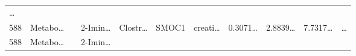 \documentclass[
]{article}
\begin{document}
\begin{longtable}[]{@{}lllllllllll@{}}
\begin{minipage}[t]{0.03\columnwidth}
\ldots{}\strut
\end{minipage}\tabularnewline
\begin{minipage}[t]{0.03\columnwidth}\raggedright
588\strut
\end{minipage} & \begin{minipage}[t]{0.07\columnwidth}\raggedright
Metabo\ldots{}\strut
\end{minipage} & \begin{minipage}[t]{0.07\columnwidth}\raggedright
\strut
\end{minipage} & \begin{minipage}[t]{0.09\columnwidth}\raggedright
2-Imin\ldots{}\strut
\end{minipage} & \begin{minipage}[t]{0.07\columnwidth}\raggedright
Clostr\ldots{}\strut
\end{minipage} & \begin{minipage}[t]{0.07\columnwidth}\raggedright
SMOC1\strut
\end{minipage} & \begin{minipage}[t]{0.09\columnwidth}\raggedright
creati\ldots{}\strut
\end{minipage} & \begin{minipage}[t]{0.07\columnwidth}\raggedright
0.3071\ldots{}\strut
\end{minipage} & \begin{minipage}[t]{0.07\columnwidth}\raggedright
2.8839\ldots{}\strut
\end{minipage} & \begin{minipage}[t]{0.07\columnwidth}\raggedright
7.7317\ldots{}\strut
\end{minipage} & \begin{minipage}[t]{0.03\columnwidth}\raggedright
\ldots{}\strut
\end{minipage}\tabularnewline
\begin{minipage}[t]{0.03\columnwidth}\raggedright
588\strut
\end{minipage} & \begin{minipage}[t]{0.07\columnwidth}\raggedright
Metabo\ldots{}\strut
\end{minipage} & \begin{minipage}[t]{0.07\columnwidth}\raggedright
\strut
\end{minipage} & \begin{minipage}[t]{0.09\columnwidth}\raggedright
2-Imin\ldots{}\strut
\end{minipage} & \begin{minipage}[t]{0.07\columnwidth}\raggedright

\end{minipage}
\end{longtable}
\end{document}
